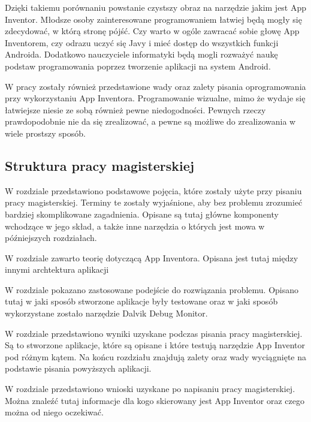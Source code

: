 Dzięki takiemu porównaniu powstanie czystszy obraz na narzędzie jakim jest App Inventor. Młodsze osoby zainteresowane programowaniem łatwiej będą mogły się zdecydować, w którą stronę pójść. Czy warto w ogóle zawracać sobie głowę App Inventorem, czy odrazu uczyć się Javy i mieć dostęp do wszystkich funkcji Androida. Dodatkowo nauczyciele informatyki będą mogli rozważyć naukę podstaw programowania poprzez tworzenie aplikacji na system Android.

W pracy zostały również przedstawione wady oraz zalety pisania oprogramowania przy wykorzystaniu App Inventora. Programowanie wizualne, mimo że wydaje się łatwiejsze niesie ze sobą również pewne niedogodności. Pewnych rzeczy prawdopodobnie nie da się zrealizować, a pewne są możliwe do zrealizowania w wiele prostszy sposób.


\subsection{Struktura pracy magisterskiej}

W rozdziale  przedstawiono podstawowe pojęcia, które zostały użyte przy pisaniu pracy magisterskiej. Terminy te zostały wyjaśnione, aby bez problemu zrozumieć bardziej skomplikowane zagadnienia. Opisane są tutaj główne komponenty wchodzące w jego skład, a także inne narzędzia o których jest mowa w późniejszych rozdziałach.

W rozdziale  zawarto teorię dotyczącą App Inventora. Opisana jest tutaj między innymi archtektura aplikacji

W rozdziale  pokazano zastosowane podejście do rozwiązania problemu. Opisano tutaj w jaki sposób stworzone aplikacje były testowane oraz w jaki sposób wykorzystane zostało narzędzie Dalvik Debug Monitor.

W rozdziale  przedstawiono wyniki uzyskane podczas pisania pracy magisterskiej. Są to stworzone aplikacje, które są opisane i które testują narzędzie App Inventor pod różnym kątem. Na końcu rozdziału znajdują zalety oraz wady wyciągnięte na podstawie pisania powyższych aplikacji.

W rozdziale  przedstawiono wnioski uzyskane po napisaniu pracy magisterskiej. Można znaleźć tutaj informacje dla kogo skierowany jest App Inventor oraz czego można od niego oczekiwać.











